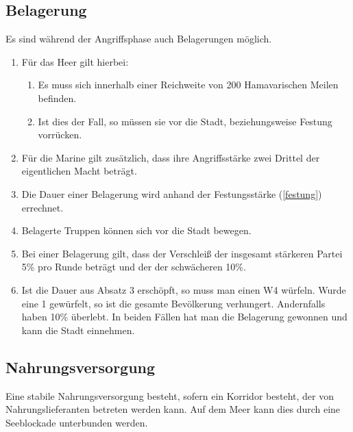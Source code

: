 \documentclass{article}
\begin{document}
\subsection{Belagerung}\label{belagerung}
Es sind während der Angriffsphase auch Belagerungen möglich.
\begin{enumerate}[(1)]
	\item Für das Heer gilt hierbei:
	\begin{enumerate}[1.]
		\item Es muss sich innerhalb einer Reichweite von 200 Hamavarischen Meilen befinden.
		\item Ist dies der Fall, so müssen sie vor die Stadt, beziehungsweise Festung vorrücken.
	\end{enumerate}
	\item Für die Marine gilt zusätzlich, dass ihre Angriffsstärke zwei Drittel der eigentlichen Macht beträgt.
	\item Die Dauer einer Belagerung wird anhand der Festungsstärke (\ref{festung}) errechnet.
	\item Belagerte Truppen können sich vor die Stadt bewegen.
	\item Bei einer Belagerung gilt, dass der Verschleiß der insgesamt stärkeren Partei 5\% pro Runde beträgt und der der schwächeren 10\%.
	\item Ist die Dauer aus Absatz 3 erschöpft, so muss man einen W4 würfeln. Wurde eine 1 gewürfelt, so ist die gesamte Bevölkerung verhungert. Andernfalls haben 10\% überlebt. In beiden Fällen hat man die Belagerung gewonnen und kann die Stadt einnehmen.
\end{enumerate}

\subsection{Nahrungsversorgung}\label{nahrung}
Eine stabile Nahrungsversorgung besteht, sofern ein Korridor besteht, der von Nahrungslieferanten betreten werden kann. Auf dem Meer kann dies durch eine Seeblockade unterbunden werden.
\end{document}
